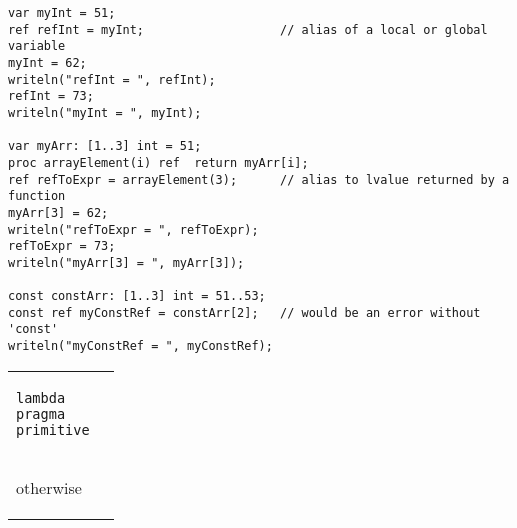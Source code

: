 \documentclass[10pt,oneside,titlepage]{spec}
\begin{document}
\begin{chapel}
\begin{verbatim}
var myInt = 51;
ref refInt = myInt;                   // alias of a local or global variable
myInt = 62;
writeln("refInt = ", refInt);
refInt = 73;
writeln("myInt = ", myInt);

var myArr: [1..3] int = 51;
proc arrayElement(i) ref  return myArr[i];
ref refToExpr = arrayElement(3);      // alias to lvalue returned by a function
myArr[3] = 62;
writeln("refToExpr = ", refToExpr);
refToExpr = 73;
writeln("myArr[3] = ", myArr[3]);

const constArr: [1..3] int = 51..53;
const ref myConstRef = constArr[2];   // would be an error without 'const'
writeln("myConstRef = ", myConstRef);
\end{verbatim}
\end{chapel}


\begin{tabular}{p{2in}p{2in}}
\begin{chapel}
\begin{verbatim}
lambda
pragma
primitive
\end{verbatim}
\end{chapel}
\\
\begin{invisible}
otherwise
\end{invisible}
\end{tabular}
\end{document}
